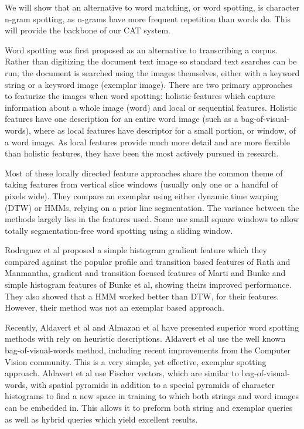 \documentclass[ms]{byuprop}
\begin{document}
We will show that an alternative to word matching, or word spotting, is character n-gram spotting, as n-grams have more frequent repetition than words do. This will provide the backbone of our CAT system.

Word spotting was first proposed as an alternative to transcribing a corpus. Rather than digitizing the document text image so standard text searches can be run, the document is searched using the images themselves, either with a keyword string or a keyword image (exemplar image). There are two primary approaches to featurize the images when word spotting: holistic features which capture information about a whole image (word) and local or sequential features\cite{Rodrıguez2008}. Holistic features have one description for an entire word image (such as a bag-of-visual-words), where as local features have descriptor for a small portion, or window, of a word image. As local features provide much more detail and are more flexible than holistic features, they have been the most actively pursued in research.

Most of these locally directed feature approaches share the common theme of taking features from vertical slice windows (usually only one or a handful of pixels wide). They compare an exemplar using either dynamic time warping (DTW) or HMMs, relying on a prior line segmentation. The variance between the methods largely lies in the features used. Some use small square windows to allow totally segmentation-free word spotting using a sliding window\cite{Rothacker2013}.

Rodr{\i}guez et al\cite{Rodrıguez2008} proposed a simple histogram gradient feature which they compared against the popular profile and transition based features of Rath and Manmantha\cite{Rath2003}, gradient and transition focused features of Marti and Bunke\cite{Marti2001} and simple histogram features of Bunke et al\cite{Bunke2004}, showing theirs improved performance. They also showed that a HMM worked better than DTW, for their features. However, their method was not an exemplar based approach.

Recently, Aldavert et al\cite{Aldavert2015} and Almazan et al\cite{Almazan2014} have presented superior word spotting methods with rely on heuristic descriptions. Aldavert et al use the well known bag-of-visual-words method, including recent improvements from the Computer Vision community. This is a very simple, yet effective, exemplar spotting approach. Aldavert et al use Fischer vectors, which are similar to bag-of-visual-words, with spatial pyramids in addition to a special pyramids of character histograms to find a new space in training to which both strings and word images can be embedded in. This allows it to preform both string and exemplar queries as well as hybrid queries which yield excellent results.
\end{document}
